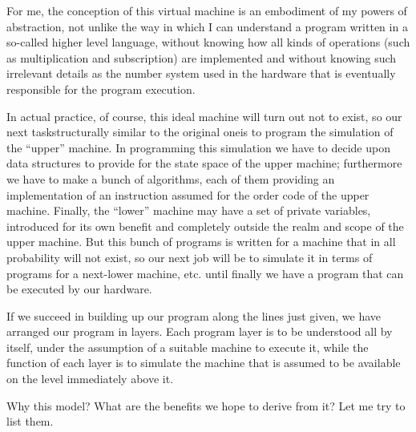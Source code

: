 \documentclass[twoside,11pt]{book}
\begin{document}
For me, the conception of this virtual machine is an embodiment of my powers of abstraction, not unlike the way in which I can understand a program written in a so-called higher level language, without knowing how all kinds of operations (such as multiplication and subscription) are implemented and without knowing such irrelevant details as the number system used in the hardware that is eventually responsible for the program execution.

In actual practice, of course, this ideal machine will turn out not to exist, so our next task\textemdash{}structurally similar to the original one\textemdash{}is to program the simulation of the ``upper'' machine. In programming this simulation we have to decide upon data structures to provide for the state space of the upper machine; furthermore we have to make a bunch of algorithms, each of them providing an implementation of an instruction assumed for the order code of the upper machine. Finally, the ``lower'' machine may have a set of private variables, introduced for its own benefit and completely outside the realm and scope of the upper machine. But this bunch of programs is written for a machine that in all probability will not exist, so our next job will be to simulate it in terms of programs for a next-lower machine, etc. until finally we have a program that can be executed by our hardware.

If we succeed in building up our program along the lines just given, we have arranged our program in layers. Each program layer is to be understood all by itself, under the assumption of a suitable machine to execute it, while the function of each layer is to simulate the machine that is assumed to be available on the level immediately above it.

Why this model? What are the benefits we hope to derive from it? Let me try to list them.
\end{document}
